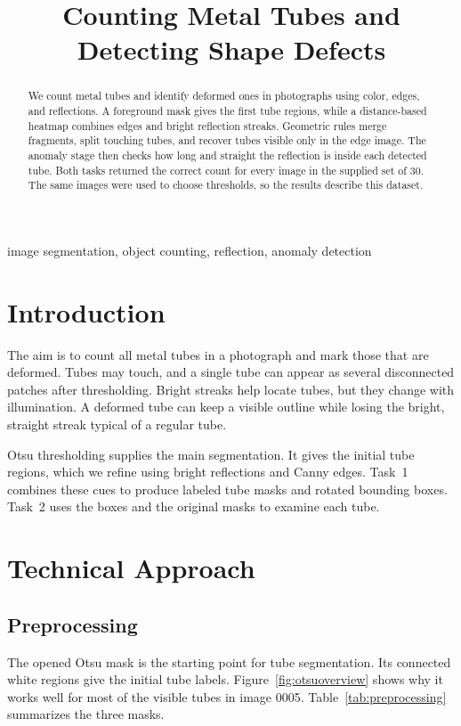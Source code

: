 \documentclass[conference]{IEEEtran}
\title{Counting Metal Tubes and Detecting Shape Defects}
\author{\IEEEauthorblockN{Magnus Johansen}
\IEEEauthorblockA{MVCOMP01 Image Analysis}}
\begin{document}
\maketitle

\begin{abstract}
We count metal tubes and identify deformed ones in photographs using color, edges, and reflections. A foreground mask gives the first tube regions, while a distance-based heatmap combines edges and bright reflection streaks. Geometric rules merge fragments, split touching tubes, and recover tubes visible only in the edge image. The anomaly stage then checks how long and straight the reflection is inside each detected tube. Both tasks returned the correct count for every image in the supplied set of 30. The same images were used to choose thresholds, so the results describe this dataset.
\end{abstract}

\begin{IEEEkeywords}
image segmentation, object counting, reflection, anomaly detection
\end{IEEEkeywords}

\section{Introduction}
The aim is to count all metal tubes in a photograph and mark those that are deformed. Tubes may touch, and a single tube can appear as several disconnected patches after thresholding. Bright streaks help locate tubes, but they change with illumination. A deformed tube can keep a visible outline while losing the bright, straight streak typical of a regular tube.

Otsu thresholding supplies the main segmentation. It gives the initial tube regions, which we refine using bright reflections and Canny edges. Task~1 combines these cues to produce labeled tube masks and rotated bounding boxes. Task~2 uses the boxes and the original masks to examine each tube.

\section{Technical Approach}
\subsection{Preprocessing}
The opened Otsu mask is the starting point for tube segmentation. Its connected white regions give the initial tube labels. Figure~\ref{fig:otsuoverview} shows why it works well for most of the visible tubes in image 0005. Table~\ref{tab:preprocessing} summarizes the three masks.
\end{document}
